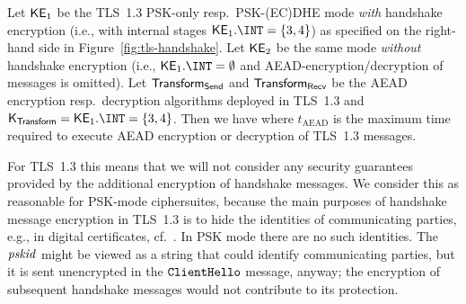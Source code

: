 \begin{theorem}
	\label{thm:TLS-transform}
	Let $\mathsf{KE}_1$ be the TLS~1.3 PSK-only resp.\ PSK-(EC)DHE mode \emph{with} handshake encryption (i.e., with internal stages $\KE_1.\INT = \{3,4\}$) as specified on the right-hand side in Figure~\ref{fig:tls-handshake}.
	Let $\mathsf{KE}_2$ be the same mode \emph{without} handshake encryption (i.e., $\KE_1.\INT = \emptyset$ and AEAD-encryption/decryption of messages is omitted).
	Let $\mathsf{Transform}_{\mathsf{Send}}$ and $\mathsf{Transform}_{\mathsf{Recv}}$ be the AEAD encryption resp.\ decryption algorithms deployed in TLS~1.3 and $\MaulKeys = \KE_1.\INT = \{3,4\}$.
Then we have	
	where $t_{\mathrm{AEAD}}$ is the maximum time required to execute AEAD encryption or decryption of TLS~1.3 messages.
\end{theorem}






For TLS~1.3 this means that we will not consider any security guarantees provided by the additional encryption of handshake messages.
We consider this as reasonable for PSK-mode ciphersuites, because the main purposes of handshake message encryption in TLS~1.3 is to hide the identities of communicating parties, e.g., in digital certificates, cf.\ \cite{PoPETS:ABFNO19}. 
In PSK mode there are no such identities. The $\mathit{pskid}$ might be viewed as a string that could identify communicating parties, but it is sent unencrypted in the $\mathtt{ClientHello}$ message, anyway; the encryption of subsequent handshake messages would not contribute to its protection. 


